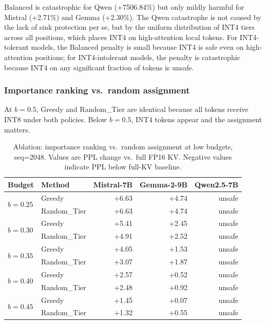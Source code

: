 \documentclass[11pt]{article}
\newcommand{\budget}{b}
\newcommand{\pct}{\%}
\theoremstyle{plain}
\theoremstyle{definition}
\begin{document}
Balanced is catastrophic for Qwen (+7506.84\pct{}) but only mildly harmful for Mistral (+2.71\pct{}) and Gemma (+2.30\pct{}).  The Qwen catastrophe is not caused by the lack of sink protection per se, but by the uniform distribution of INT4 tiers across all positions, which places INT4 on high-attention local tokens.  For INT4-tolerant models, the Balanced penalty is small because INT4 is safe even on high-attention positions; for INT4-intolerant models, the penalty is catastrophic because INT4 on any significant fraction of tokens is unsafe.

\subsubsection{Importance ranking vs.\ random assignment}
\label{sec:ablation-ranking}

At $\budget=0.5$, Greedy and Random\_Tier are identical because all tokens receive INT8 under both policies.  Below $\budget=0.5$, INT4 tokens appear and the assignment matters.

\begin{table}[t]
\centering
\caption{Ablation: importance ranking vs.\ random assignment at low budgets, seq=2048.  Values are PPL change vs.\ full FP16 KV.  Negative values indicate PPL below full-KV baseline.}
\label{tab:ablation-ranking}
\small
\begin{tabular}{llrrr}
\toprule
Budget & Method & Mistral-7B & Gemma-2-9B & Qwen2.5-7B \\
\midrule
\multirow{2}{*}{$\budget=0.25$}
  & Greedy & +6.63 & +4.74 & unsafe \\
  & Random\_Tier & +6.63 & +4.74 & unsafe \\
\midrule
\multirow{2}{*}{$\budget=0.30$}
  & Greedy & +5.41 & +2.45 & unsafe \\
  & Random\_Tier & +4.91 & +2.52 & unsafe \\
\midrule
\multirow{2}{*}{$\budget=0.35$}
  & Greedy & +4.05 & +1.53 & unsafe \\
  & Random\_Tier & +3.07 & +1.87 & unsafe \\
\midrule
\multirow{2}{*}{$\budget=0.40$}
  & Greedy & +2.57 & +0.52 & unsafe \\
  & Random\_Tier & +2.48 & +0.92 & unsafe \\
\midrule
\multirow{2}{*}{$\budget=0.45$}
  & Greedy & +1.45 & +0.07 & unsafe \\
  & Random\_Tier & +1.32 & +0.55 & unsafe \\
\bottomrule
\end{tabular}
\end{table}
\end{document}
